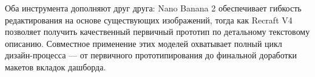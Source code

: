 Оба инструмента дополняют друг друга: Nano Banana 2 обеспечивает гибкость редактирования на основе существующих изображений, тогда как Recraft V4 позволяет получить качественный первичный прототип по детальному текстовому описанию. Совместное применение этих моделей охватывает полный цикл дизайн-процесса — от первичного прототипирования до финальной доработки макетов вкладок дашборда.
